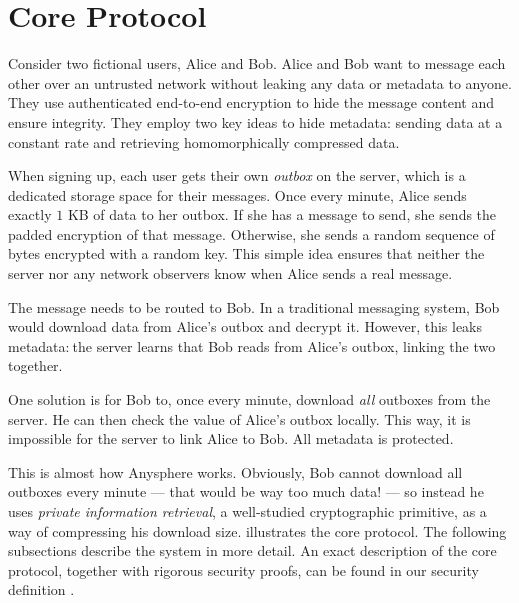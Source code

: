 \section{Core Protocol}
\label{sec:coreprotocol}

Consider two fictional users, Alice and Bob. Alice and Bob want to message each other over an untrusted network without leaking any data or metadata to anyone. They use authenticated end-to-end encryption to hide the message content and ensure integrity. They employ two key ideas to hide metadata: sending data at a constant rate and retrieving homomorphically compressed data.


When signing up, each user gets their own \textit{outbox} on the server, which is a dedicated storage space for their messages. Once every minute, Alice sends exactly $1$ KB of data to her outbox. If she has a message to send, she sends the padded encryption of that message. Otherwise, she sends a random sequence of bytes encrypted with a random key. This simple idea ensures that neither the server nor any network observers know when Alice sends a real message.

The message needs to be routed to Bob. In a traditional messaging system, Bob would download data from Alice's outbox and decrypt it. However, this leaks metadata:$~$the server learns that Bob reads from Alice's outbox, linking the two together.

One solution is for Bob to, once every minute, download \textit{all} outboxes from the server. He can then check the value of Alice's outbox locally. This way, it is impossible for the server to link Alice to Bob. All metadata is protected.

This is almost how Anysphere works. Obviously, Bob cannot download all outboxes every minute — that would be way too much data! — so instead he uses \textit{private information retrieval}, a well-studied cryptographic primitive, as a way of compressing his download size.  illustrates the core protocol. The following subsections describe the system in more detail. An exact description of the core protocol, together with rigorous security proofs, can be found in our security definition \cite{LAZ22SecDef}.

